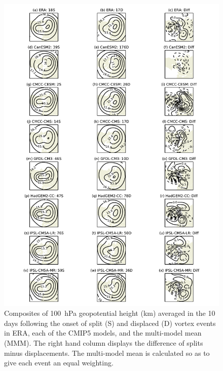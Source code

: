 \begin{figure}
 \centering
 \noindent\includegraphics[width=\textwidth]{figures/chapter-models/100hPa_GPH1.pdf}
 \caption[NAM composites for splits and displacements in the CMIP5
 models]{Composites of 100~hPa geopotential height (km) averaged in the 10 days
   following the onset of split (S) and displaced (D) vortex events in ERA, each
   of the CMIP5 models, and the multi-model mean (MMM). The right hand column
   displays the difference of splits minus displacements. The multi-model mean
   is calculated so as to give each event an equal weighting.}
 \label{fig:cmip5_100hPa_comp}
\end{figure}

